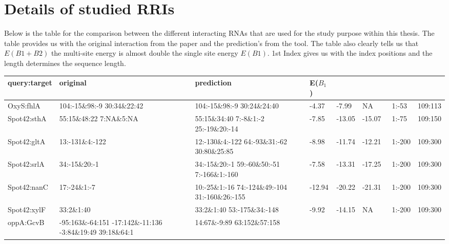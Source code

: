 \documentclass[twoside,a4paper]{report}
\numberwithin{equation}{section}
\begin{document}
\section{Details of studied RRIs}

Below is the table for the comparison between the different interacting RNAs that are used for the study purpose within this thesis. The table provides us with the original interaction from the paper and the prediction's from the tool. The table also clearly tells us that $E(B1+ B2)$ the multi-site energy is almost double the single site energy $E(B1)$. 1st Index gives us with the index positions and the length determines the sequence length.\\
	
\begin{table}[H]
	

	\begin{tabular}{ |p{2cm}|p{2.5cm}|p{2.2cm}|p{0.8cm}|p{0.9cm}|p{0.9cm}|p{0.8cm}|p{1cm}|}
	
		\hline
		query:target& original& prediction& \rotatebox[origin=c]{90} {E($B_1$)}  &\rotatebox[origin=c]{90}{E($B_1+B_2$)} &\rotatebox[origin=c]{90}{E($B_1+B_2+B_3$)}  &\rotatebox[origin=c]{90}{1st index}  &\rotatebox[origin=c]{90}{length} \\
		\hline
		\hline
		OxyS:fhlA&104:-15\&98:-9 30:34\&22:42
		&104:-15\&98:-9 30:24\&24:40&-4.37 &-7.99 &NA &1:-53&109:113\\
		\hline
		Spot42:sthA&55:15\&48:22  7:NA\&5:NA & 55:15\&34:40 \hbox{7:-8\&1:-2} \hbox{25:-19\&20:-14}
		& -7.85 & \hbox{-13.05} & \hbox{-15.07} & 1:-75 &109:150 \\
		\hline
		Spot42:gltA& 13:-131\&4:-122  & \hbox{12:-130\&4:-122} \hbox{64:-93\&31:-62} \hbox{30:80\&25:85}
		& -8.98 & \hbox{-11.74} & \hbox{-12.21 } & \hbox{1:-200}&109:300 \\
		\hline
		Spot42:srlA& 34:-15\&20:-1 & 34:-15\&20:-1 \hbox{59:-60\&50:-51} \hbox{7:-166\&1:-160}
		& -7.58 & \hbox{-13.31} & \hbox{-17.25} & \hbox{1:-200} & 109:300 \\
		\hline
		Spot42:nanC& 17:-24\&1:-7 & 10:-25\&1:-16 \hbox{74:-124\&49:-104} \hbox{31:-160\&26:-155}
		& \hbox{-12.94} & \hbox{-20.22} & \hbox{-21.31} & \hbox{1:-200} & 109:300 \\
		\hline
		Spot42:xylF& 33:2\&1:40 & 33:2\&1:40 \hbox{53:-175\&34:-148}
		& -9.92 & \hbox{-14.15} & \hbox{NA} & \hbox{1:-200}&109:300 \\
		\hline
		oppA:GcvB &-95:163\&-64:151 -17:142\&-11:136 -3:84\&19:49 39:18\&64:1  &14:67\&-9:89 63:152\&57:158
		

\end{tabular}
\end{table}
\end{document}
